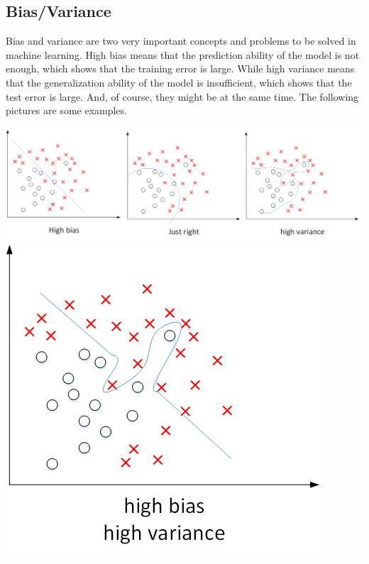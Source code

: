 \documentclass[10pt]{article}
\begin{document}
  \subsection{Bias/Variance}
  
  \begin{flushleft}
  
    Bias and variance are two very important concepts and problems to be solved in machine learning. High bias means that the prediction ability of the model is not enough, which shows that the training error is large. While high variance means that the generalization ability of the model is insufficient, which shows that the test error is large. And, of course, they might be at the same time. The following pictures are some examples. 
     
  \end{flushleft}
    
  
  \begin{center}
    \includegraphics[scale=0.4]{bias.jpg}
    \includegraphics[scale=0.4]{sametime.jpg}
  \end{center}
  
\end{document}
